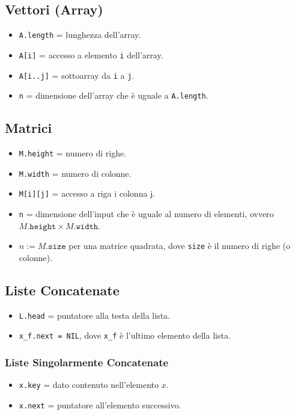 \subsection{Vettori (Array)}
\begin{itemize}
    \item \texttt{A.length} = lunghezza dell'array.
    \item \texttt{A[i]} = accesso a elemento \texttt{i} dell'array.
    \item \texttt{A[i..j]} = sottoarray da \texttt{i} a \texttt{j}.
    \item \texttt{n} = dimensione dell'array che è uguale a \texttt{A.length}.
\end{itemize}

\subsection{Matrici}
\begin{itemize}
    \item \texttt{M.height} = numero di righe.
    \item \texttt{M.width} = numero di colonne.
    \item \texttt{M[i][j]} = accesso a riga i colonna j.
    \item \texttt{n} = dimensione dell'input che è uguale al numero di elementi, ovvero $M.\texttt{height} \times M.\texttt{width}$.
    \item $n := M.\texttt{size}$ per una matrice quadrata, dove \texttt{size} è il numero di righe (o colonne).
\end{itemize}

\subsection{Liste Concatenate}
\begin{itemize}
    \item \texttt{L.head} = puntatore alla testa della lista.
    \item \texttt{x\_f.next = NIL}, dove \texttt{x\_f} è l'ultimo elemento della lista.
\end{itemize}

\subsubsection{Liste Singolarmente Concatenate}
\begin{itemize}
    \item \texttt{x.key} = dato contenuto nell'elemento $x$.
    \item \texttt{x.next} = puntatore all'elemento successivo.
\end{itemize}

